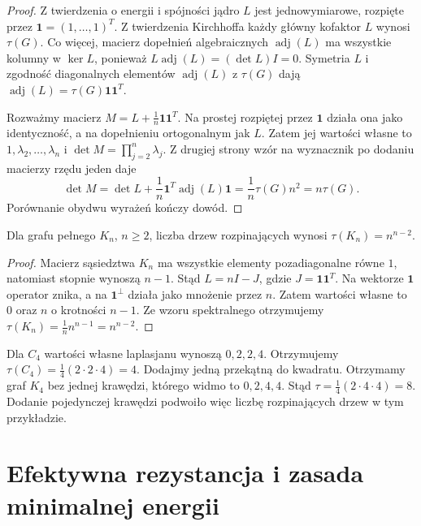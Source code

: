 \begin{proof}
Z twierdzenia o energii i spójności jądro $L$ jest
jednowymiarowe, rozpięte przez $\mathbf1=(1,\ldots,1)^T$.
Z twierdzenia Kirchhoffa każdy główny kofaktor $L$
wynosi $\tau(G)$. Co więcej, macierz dopełnień
algebraicznych $\operatorname{adj}(L)$ ma wszystkie
kolumny w $\ker L$, ponieważ
$L\operatorname{adj}(L)=(\det L)I=0$.
Symetria $L$ i zgodność diagonalnych elementów
$\operatorname{adj}(L)$ z $\tau(G)$ dają
$\operatorname{adj}(L)=\tau(G)\mathbf1\mathbf1^T$.

Rozważmy macierz
$M=L+\tfrac1n\mathbf1\mathbf1^T$.
Na prostej rozpiętej przez $\mathbf1$ działa ona jako
identyczność, a na dopełnieniu ortogonalnym jak $L$.
Zatem jej wartości własne to $1,\lambda_2,\ldots,\lambda_n$
i $\det M=\prod_{j=2}^n\lambda_j$.
Z drugiej strony wzór na wyznacznik po dodaniu
macierzy rzędu jeden daje
\[
\det M=\det L+\frac1n\mathbf1^T\operatorname{adj}(L)\mathbf1
=\frac1n\tau(G)n^2=n\tau(G).
\]
Porównanie obydwu wyrażeń kończy dowód.
\end{proof}

\begin{wniosek}
Dla grafu pełnego $K_n$, $n\ge2$, liczba drzew
rozpinających wynosi $\tau(K_n)=n^{n-2}$.
\end{wniosek}

\begin{proof}
Macierz sąsiedztwa $K_n$ ma wszystkie elementy
pozadiagonalne równe $1$, natomiast stopnie wynoszą
$n-1$. Stąd $L=nI-J$, gdzie $J=\mathbf1\mathbf1^T$.
Na wektorze $\mathbf1$ operator znika, a na
$\mathbf1^\perp$ działa jako mnożenie przez $n$.
Zatem wartości własne to $0$ oraz $n$ o krotności $n-1$.
Ze wzoru spektralnego otrzymujemy
$\tau(K_n)=\frac1n n^{n-1}=n^{n-2}$.
\end{proof}

\begin{przyklad}
Dla $C_4$ wartości własne laplasjanu wynoszą
$0,2,2,4$. Otrzymujemy $\tau(C_4)=\frac14(2\cdot2\cdot4)=4$.
Dodajmy jedną przekątną do kwadratu. Otrzymamy graf
$K_4$ bez jednej krawędzi, którego widmo to $0,2,4,4$.
Stąd $\tau=\frac14(2\cdot4\cdot4)=8$.
Dodanie pojedynczej krawędzi podwoiło więc liczbę
rozpinających drzew w tym przykładzie.
\end{przyklad}

\section{Efektywna rezystancja i zasada minimalnej energii}
\label{sec:tg-resistance}

